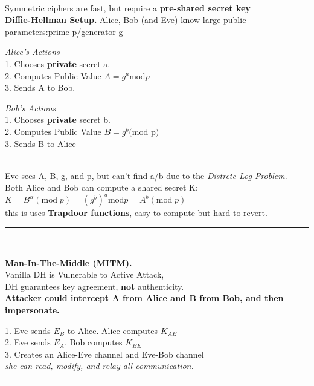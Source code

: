 \documentclass[9pt, a4paper]{extarticle}
\makeatletter
\renewcommand{\hline}{\noalign{\vskip 2px}\hrule\@height\arrayrulewidth\@width\linewidth\noalign{\vskip 2px}}
\makeatother
\begin{document}
\begin{minipage}[t]{0.495\textwidth}
{\begin{minipage}[htp]{0.97\textwidth}
		\end{minipage}
	}\\
	Symmetric ciphers are fast, but require a \textbf{pre-shared secret key}\\
	\textbf{Diffie-Hellman Setup.} Alice, Bob (and Eve) know large public parameters:prime p/generator g\\
	\begin{minipage}[htp]{0.5\textwidth}
		\textit{Alice's Actions}\\
		1. Chooses \textbf{private} secret a.\\
		2. Computes Public Value $A = g^a \text{mod}p$\\
		3. Sends A to Bob.
	\end{minipage}
	\begin{minipage}[htp]{0.5\textwidth}
		\textit{Bob's Actions}\\
		1. Chooses \textbf{private} secret b.\\
		2. Computes Public Value $B = g^b \text{(mod p)}$\\
		3. Sends B to Alice
	\end{minipage}\\
	Eve sees A, B, g, and p, but can't find a/b due to the \textit{Distrete Log Problem}.\\
	Both Alice and Bob can compute a shared secret K:
	$K = B^{\alpha} (\text{mod}\;p) = (g^b)^a \text{mod} p = A^b (\text{mod} \; p)$\\
	this is uses \textbf{Trapdoor functions}, easy to compute but hard to revert.
	\hline\\
	\begin{minipage}[t]{0.47\textwidth}
		\textbf{Man-In-The-Middle (MITM).} \\Vanilla DH is Vulnerable to Active Attack,\\
		DH guarantees key agreement, \textbf{not} authenticity.\\
		\textbf{Attacker could intercept A from Alice and B from Bob, and then impersonate.}
	\end{minipage}
	\begin{minipage}[t]{0.53\textwidth}
		1. Eve sends $E_{B}$ to Alice. Alice computes $K_{AE}$\\
		2. Eve sends $E_{A}$. Bob computes $K_{BE}$\\
		3. Creates an Alice-Eve channel and Eve-Bob channel\\
		\textit{she can read, modify, and relay all communication.}
	\end{minipage}\hline

\end{minipage}
\end{document}
